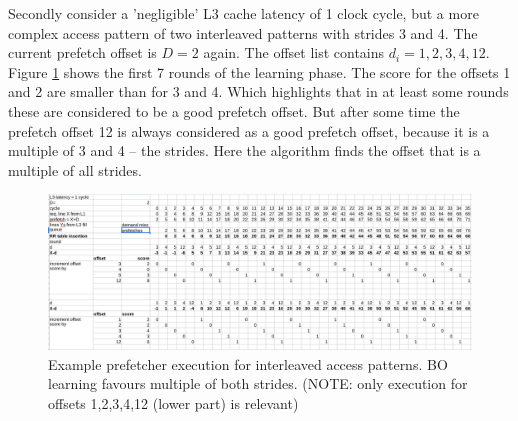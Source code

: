 \documentclass[conference]{IEEEtran}
\begin{document}
Secondly consider a 'negligible' L3 cache latency of 1 clock cycle, but a more complex access pattern of two interleaved patterns with strides 3 and 4.
The current prefetch offset is $D=2$ again. The offset list contains $d_i = 1,2,3,4,12$.
Figure \ref{fig:bo-prefetcher-execution-interleved-patterns} shows the first 7 rounds of the learning phase.
The score for the offsets 1 and 2 are smaller than for 3 and 4. Which highlights that in at least some rounds these are considered to be a good prefetch offset.
But after some time the prefetch offset 12 is always considered as a good prefetch offset, because it is a multiple of 3 and 4 -- the strides.
Here the algorithm finds the offset that is a multiple of all strides.
\begin{figure}[h]
    \centering
    \includegraphics[width=1.0\columnwidth]{figures/example_demonstrating_scoring_multiple_of_both_streams_higher_than_multiples_of_only_one_part.png}
    \caption{Example prefetcher execution for interleaved access patterns. BO learning favours multiple of both strides. (NOTE: only execution for offsets 1,2,3,4,12 (lower part) is relevant)}
    \label{fig:bo-prefetcher-execution-interleved-patterns}
\end{figure}
\end{document}
